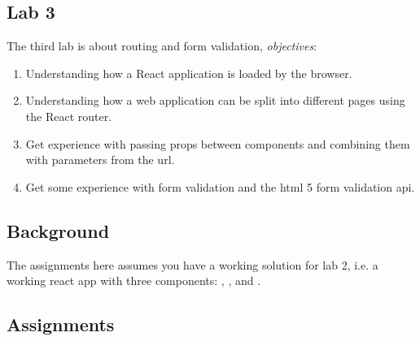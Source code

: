 \documentclass[fleqn, article, a4paper]{memoir}
\begin{document}
\maketitle
\thispagestyle{titlepage}
\vspace{-4cm}

\subsection*{Lab 3}

\n The third lab is about routing and form validation, \emph{objectives}:

\begin{enumerate}\firmlist
\item Understanding how a React application is loaded by the browser.
\item Understanding how a web application can be split into different pages using the React router.
\item Get experience with passing props between components and combining them with parameters from the url.
\item Get some experience with form validation and the html 5 form validation api.
\end{enumerate}

\subsection*{Background}

The assignments here assumes you have a working solution for lab 2, i.e. a working react app with three components: , , and .

\subsection*{Assignments}
\end{document}
